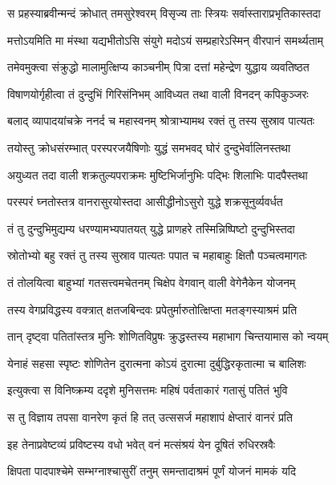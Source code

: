 \twolineshloka
{स प्रहस्याब्रवीन्मन्दं क्रोधात् तमसुरेश्वरम्}
{विसृज्य ताः स्त्रियः सर्वास्ताराप्रभृतिकास्तदा} %

\twolineshloka
{मत्तोऽयमिति मा मंस्था यद्यभीतोऽसि संयुगे}
{मदोऽयं सम्प्रहारेऽस्मिन् वीरपानं समर्थ्यताम्} %

\twolineshloka
{तमेवमुक्त्वा संक्रुद्धो मालामुत्क्षिप्य काञ्चनीम्}
{पित्रा दत्तां महेन्द्रेण युद्धाय व्यवतिष्ठत} %

\twolineshloka
{विषाणयोर्गृहीत्वा तं दुन्दुभिं गिरिसंनिभम्}
{आविध्यत तथा वाली विनदन् कपिकुञ्जरः} %

\twolineshloka
{बलाद् व्यापादयांचक्रे ननर्द च महास्वनम्}
{श्रोत्राभ्यामथ रक्तं तु तस्य सुस्राव पात्यतः} %

\twolineshloka
{तयोस्तु क्रोधसंरम्भात् परस्परजयैषिणोः}
{युद्धं समभवद् घोरं दुन्दुभेर्वालिनस्तथा} %

\twolineshloka
{अयुध्यत तदा वाली शक्रतुल्यपराक्रमः}
{मुष्टिभिर्जानुभिः पद्भिः शिलाभिः पादपैस्तथा} %

\twolineshloka
{परस्परं घ्नतोस्तत्र वानरासुरयोस्तदा}
{आसीद्धीनोऽसुरो युद्धे शक्रसूनुर्व्यवर्धत} %

\twolineshloka
{तं तु दुन्दुभिमुद्यम्य धरण्यामभ्यपातयत्}
{युद्धे प्राणहरे तस्मिन्निष्पिष्टो दुन्दुभिस्तदा} %

\twolineshloka
{स्रोतोभ्यो बहु रक्तं तु तस्य सुस्राव पात्यतः}
{पपात च महाबाहुः क्षितौ पञ्चत्वमागतः} %

\twolineshloka
{तं तोलयित्वा बाहुभ्यां गतसत्त्वमचेतनम्}
{चिक्षेप वेगवान् वाली वेगेनैकेन योजनम्} %

\twolineshloka
{तस्य वेगप्रविद्धस्य वक्त्रात् क्षतजबिन्दवः}
{प्रपेतुर्मारुतोत्क्षिप्ता मतङ्गस्याश्रमं प्रति} %

\twolineshloka
{तान् दृष्ट्वा पतितांस्तत्र मुनिः शोणितविप्रुषः}
{क्रुद्धस्तस्य महाभाग चिन्तयामास को न्वयम्} %

\twolineshloka
{येनाहं सहसा स्पृष्टः शोणितेन दुरात्मना}
{कोऽयं दुरात्मा दुर्बुद्धिरकृतात्मा च बालिशः} %

\twolineshloka
{इत्युक्त्वा स विनिष्क्रम्य ददृशे मुनिसत्तमः}
{महिषं पर्वताकारं गतासुं पतितं भुवि} %

\twolineshloka
{स तु विज्ञाय तपसा वानरेण कृतं हि तत्}
{उत्ससर्ज महाशापं क्षेप्तारं वानरं प्रति} %

\twolineshloka
{इह तेनाप्रवेष्टव्यं प्रविष्टस्य वधो भवेत्}
{वनं मत्संश्रयं येन दूषितं रुधिरस्रवैः} %

\twolineshloka
{क्षिपता पादपाश्चेमे सम्भग्नाश्चासुरीं तनुम्}
{समन्तादाश्रमं पूर्णं योजनं मामकं यदि} %

